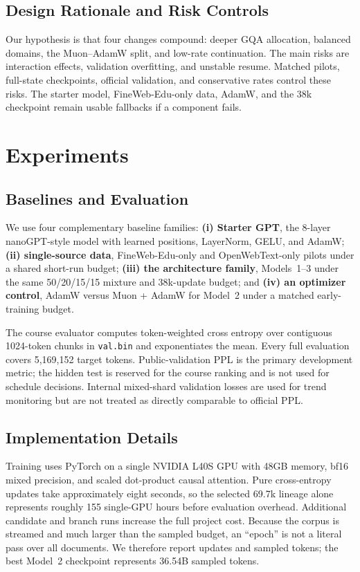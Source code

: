 \documentclass{article}
\begin{document}
\subsection{Design Rationale and Risk Controls}

Our hypothesis is that four changes compound: deeper GQA allocation, balanced
domains, the Muon--AdamW split, and low-rate continuation. The main risks are
interaction effects, validation overfitting, and unstable resume. Matched
pilots, full-state checkpoints, official validation, and conservative rates
control these risks. The starter model, FineWeb-Edu-only data, AdamW, and the
38k checkpoint remain usable fallbacks if a component fails.

\section{Experiments}
\label{sec:experiments}

\subsection{Baselines and Evaluation}

We use four complementary baseline families: \textbf{(i) Starter GPT}, the
8-layer nanoGPT-style model with learned positions, LayerNorm, GELU, and
AdamW; \textbf{(ii) single-source data}, FineWeb-Edu-only and
OpenWebText-only pilots under a shared short-run budget; \textbf{(iii) the
architecture family}, Models~1--3 under the same 50/20/15/15 mixture and
38k-update budget; and \textbf{(iv) an optimizer control}, AdamW versus
Muon + AdamW for Model~2 under a matched early-training budget.

The course evaluator computes token-weighted cross entropy over contiguous
1024-token chunks in \texttt{val.bin} and exponentiates the mean. Every full
evaluation covers 5,169,152 target tokens. Public-validation PPL is the
primary development metric; the hidden test is reserved for the course ranking
and is not used for schedule decisions. Internal mixed-shard validation losses
are used for trend monitoring but are not treated as directly comparable to
official PPL.

\subsection{Implementation Details}

Training uses PyTorch on a single NVIDIA L40S GPU with 48GB memory, bf16 mixed
precision, and scaled dot-product causal attention. Pure cross-entropy updates
take approximately eight seconds, so the selected 69.7k lineage alone
represents roughly 155 single-GPU hours before evaluation overhead. Additional
candidate and branch runs increase the full project cost. Because the corpus
is streamed and much larger than the sampled budget, an ``epoch'' is not a
literal pass over all documents. We therefore report updates and sampled
tokens; the best Model~2 checkpoint represents 36.54B sampled tokens.
\end{document}
